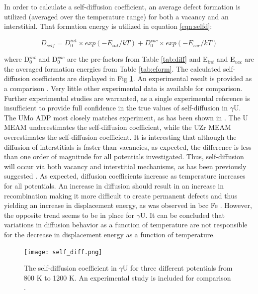 \documentclass[review]{elsarticle}
\begin{document}
In order to calculate a self-diffusion coefficient, an average defect formation is utilized (averaged over the temperature range) for both a vacancy and an interstitial. That formation energy is utilized in equation \ref{eqn:selfd}:

\begin{equation}
\label{eqn:selfd}
D_{self} = D^{int}_{0} \times exp(-E_{int}/kT) + D^{vac}_{0} \times exp(-E_{vac}/kT)
\end{equation} 

where D$^{int}_{0}$ and D$^{vac}_{0}$ are the pre-factors from Table \ref{tab:diff} and E$_{int}$ and E$_{vac}$ are the averaged formation energies from Table \ref{tab:eform}. The calculated self-diffusion coefficients are displayed in Fig \ref{fig:gamUdiff}. An experimental result is provided as a comparison \cite{adda1959}. Very little other experimental data is available for comparison. Further experimental studies are warranted, as a single experimental reference is insufficient to provide full confidence in the true values of self-diffusion in $\gamma$U. The UMo ADP most closely matches experiment, as has been shown in \cite{smirnovaADP}. The U MEAM underestimates the self-diffusion coefficient, while the UZr MEAM overestimates the self-diffusion coefficient. It is interesting that although the diffusion of interstitials is faster than vacancies, as expected, the difference is less than one order of magnitude for all potentials investigated. Thus, self-diffusion will occur via both vacancy and interstitial mechanisms, as has been previously suggested \cite{fedorov1978, smirnov1992}. As expected, diffusion coefficients increase as temperature increases for all potentials. An increase in diffusion should result in an increase in recombination making it more difficult to create permanent defects and thus yielding an increase in displacement energy, as was observed in bcc Fe \cite{beeler2016}. However, the opposite trend seems to be in place for $\gamma$U. It can be concluded that variations in diffusion behavior as a function of temperature are not responsible for the decrease in displacement energy as a function of temperature.

\begin{figure}[h]
 \centering
 \texttt{[image: self\_diff.png]} 
 \caption{The self-diffusion coefficient in $\gamma$U for three different potentials from 800 K to 1200 K. An experimental study is included for comparison \cite{adda1959}.}
 \label{fig:gamUdiff}
\end{figure}
\end{document}
